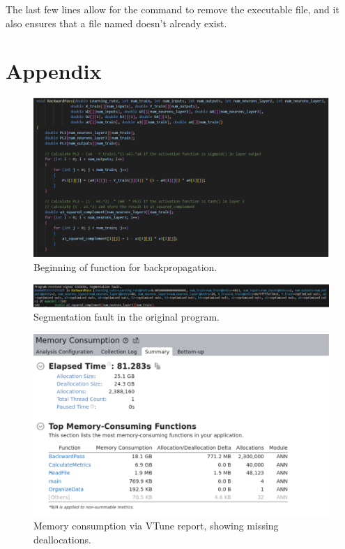 \documentclass[12pt]{article}
\begin{document}
The last few lines allow for the  command to remove the executable file, and it also ensures that a file named  doesn’t already exist.

\section{Appendix}

\begin{figure}[h]
    \centering
    \includegraphics[width=\textwidth]{Figure1.png}
    \caption{Beginning of  function for backpropagation.}
    \label{fig:figure1}
\end{figure}

\begin{figure}[h]
    \centering
    \includegraphics[width=\textwidth]{Figure2.png}
    \caption{Segmentation fault in the original program.}
    \label{fig:figure2}
\end{figure}

\begin{figure}[h]
    \centering
    \includegraphics[width=\textwidth]{Figure3.png}
    \caption{Memory consumption via VTune report, showing missing deallocations.}
    \label{fig:figure3}
\end{figure}
\end{document}
